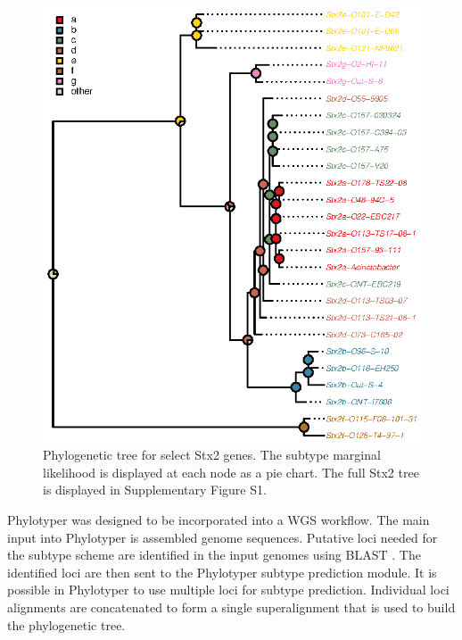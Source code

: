 \documentclass{bioinfo}
\begin{document}
\begin{figure}[!tpb]%
\centerline{\includegraphics{fig01.eps}}
\caption{Phylogenetic tree for select Stx2 genes. 
The subtype marginal likelihood is displayed at each node as a pie chart.
The full Stx2 tree is displayed in Supplementary Figure S1.}\label{fig:01}
\end{figure}

Phylotyper was designed to be incorporated into a WGS workflow.  
The main input into Phylotyper is assembled genome sequences.  
Putative loci needed for the subtype scheme are identified in the input genomes using BLAST \citep{Camacho2009}.
The identified loci are then sent to the Phylotyper subtype prediction module.
It is possible in Phylotyper to use multiple loci for subtype prediction.
Individual loci alignments are concatenated to form a single superalignment that is used to build the phylogenetic tree.
\end{document}
